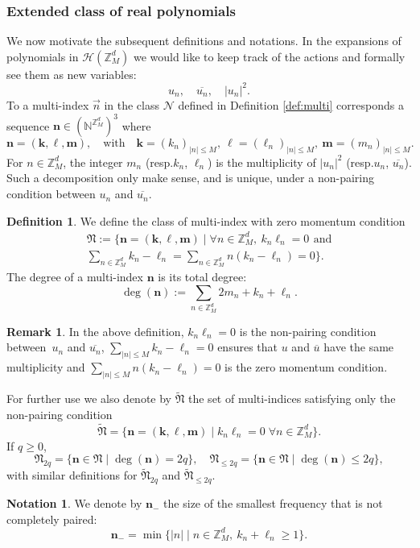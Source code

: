 \documentclass[10pt,a4paper]{amsart}
\providecommand{\resp}{resp.}
\let\ts\textstyle
\theoremstyle{plain}
\theoremstyle{definition}
\newtheorem{definition}[theorem]{Definition}
\newtheorem{notation}[theorem]{Notation}
\newtheorem{remark}[theorem]{Remark}
\newcommand{\nb}{{\boldsymbol n}}
\newcommand{\kb}{{\boldsymbol k}}
\newcommand{\lb}{{\boldsymbol \ell}}
\newcommand{\mb}{{\boldsymbol m}}
\newcommand{\Nb}{{\boldsymbol{\mathfrak{N}}}}
\newcommand{\N}{\mathbb{N}}
\newcommand{\Z}{\mathbb{Z}}
\newcommand{\1}{\mathbf{1}}
\begin{document}
\subsubsection{Extended class of real polynomials}
We now motivate the subsequent definitions and notations. In the expansions of polynomials in $\mathcal{H}(\Z_{M}^{d})$ we would like to keep track of the actions and formally see them as new variables:\vspace*{-3pt}
\[
u_{n},\quad \overline{u_{n}},\quad |u_{n}|^{2}.
\]
To a multi-index $\vec{n}$ in the class $\mathcal{N}$ defined in Definition \ref{def:multi} corresponds a sequence $\nb\in(\N^{\Z_{M}^{d}})^{3}$ where
\[
\nb = (\kb, \lb,\mb),\quad \text{with}\quad \kb = (k_{n})_{|n|\leq M},\ \lb = (\ell_{n})_{|n|\leq M},\ \mb = (m_{n})_{|n|\leq M}.
\]
For $n\in\Z_{M}^{d}$, the integer $m_{n}$ (\resp $k_{n}$, $\ell_{n}$) is the multiplicity of $|u_{n}|^{2}$ (\resp $u_{n}$, $\overline{u_{n}}$). Such a decomposition only make sense, and is unique, under a non-pairing condition between $u_{n}$ and $\overline{u_{n}}$.

\begin{definition}
\label{def:multi-bis}
We define the class of multi-index with zero momentum condition
\begin{multline}
\label{eq:monomial}
\Nb := \bigl\{\nb=(\kb,\lb,\mb) \mid \forall n\in\Z_{M}^{d},\ k_n\ell_n=0\,\ \text{and}\\\ts \sum_{n\in\Z_{M}^{d}}k_{n}-\ell_{n}
=\sum_{n\in\Z_{M}^{d}}n(k_{n}-\ell_{n})=0\bigr\}.
\end{multline}
The degree of a multi-index $\nb$ is its total degree:
\[
\deg(\nb) := \sum_{n\in\Z_{M}^{d}}2m_{n}+ k_{n} + \ell_{n}.
\]
\end{definition}
\begin{remark}
In the above definition, $k_{n}\ell_{n}=0$ is the non-pairing condition between~$u_{n}$ and $\overline{u_{n}}$, $\sum_{|n|\leq M}k_{n}-\ell_{n}=0$ ensures that $u$ and $\overline{u}$ have the same multiplicity and $\sum_{|n|\leq M}n(k_{n}-\ell_{n}) = 0$ is the zero momentum condition.
\end{remark}

For further use we also denote by $\widetilde{\Nb}$ the set of multi-indices satisfying only the non-pairing condition
\begin{equation}
\label{eq:N2q-t}
\widetilde{\mathcal{\Nb}} = \{\nb=(\kb,\lb,\mb)\mid k_n\ell_n=0\; \forall n\in\Z_{M}^{d}\}.
\end{equation}
If $q\geq0$,
\begin{equation}
\label{eq:N2q}
{\Nb}_{2q} = \{ \nb\in{\Nb}\mid \deg(\nb)= 2q\},\quad {\Nb}_{\leq 2q} = \{ \nb\in{\Nb}\mid \deg(\nb) \leq 2q\},
\end{equation}
with similar definitions for $\widetilde{\Nb}_{2q}$ and $\widetilde{\Nb}_{\leq 2q}$.
\begin{notation}
We denote by $\nb_{-}$ the size of the smallest frequency that is not completely paired:
\begin{equation}
\label{eq:n-}
\nb_{-}=\min\{|n|\mid n\in\Z_{M}^{d},\ k_{n}+\ell_{n}\geq1\}.
\end{equation}
\end{notation}
\end{document}
